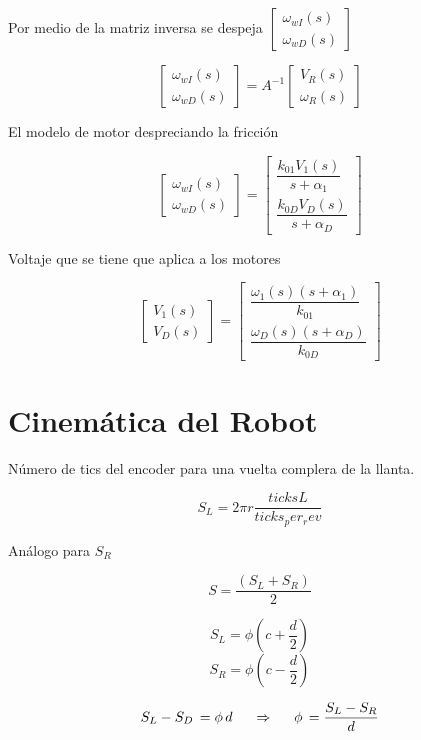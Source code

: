 Por medio de la matriz inversa se despeja 
$
\begin{bmatrix}
\omega_{wI}(s) \\
\omega_{wD}(s)
\end{bmatrix}
$

\[
\begin{bmatrix}
\omega_{wI}(s) \\
\omega_{wD}(s)
\end{bmatrix} = A^{-1} \begin{bmatrix}
V_{R}(s) \\
\omega_{R}(s)
\end{bmatrix}
\]

El modelo de motor despreciando la fricción

\[
\begin{bmatrix}
\omega_{wI}(s) \\
\omega_{wD}(s)
\end{bmatrix} = \begin{bmatrix} \dfrac{k_{01}V_{1}(s)}{s+\alpha_{1}}\\ \dfrac{k_{0D}V_{D}(s)}{s+\alpha_{D}}
\end{bmatrix}
\]

Voltaje que se tiene que aplica a los motores

\[
\begin{bmatrix}
V_{1}(s) \\
V_{D}(s)
\end{bmatrix} = \begin{bmatrix} \dfrac{\omega_{1}(s)(s+\alpha_{1})}{k_{01}}\\ \dfrac{\omega_{D}(s)(s+\alpha_{D})}{k_{0D}}
\end{bmatrix}
\]

\section{Cinemática del Robot}

Número de tics del encoder para una vuelta complera de la llanta.



$$S_{L} = 2 \pi r\frac{ticks{L}}{ticks_per_rev}$$

Análogo para $S_{R}$

$$S=\frac{(S_{L}+S_{R})}{2}$$


$$S_{L}=\phi(c+\frac{d}{2})$$
$$S_{R}=\phi(c-\frac{d}{2})$$

$$S_{L} - S_{D} \, = \phi\,d \hspace{0.5cm}  \Rightarrow \hspace{0.5cm} \phi \,= \frac{S_{L} - S_{R}}{d}$$
	

